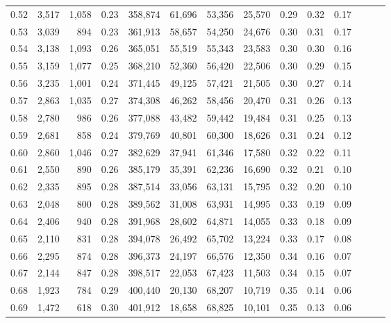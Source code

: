 \begin{tabular}{rrrrrrrrrrrrrr}
0.52 &   3,517 &  1,058 &  0.23 &  358,874 &   61,696 &  53,356 &  25,570 &  0.29 &  0.32 &      0.17 \\
0.53 &   3,039 &    894 &  0.23 &  361,913 &   58,657 &  54,250 &  24,676 &  0.30 &  0.31 &      0.17 \\
0.54 &   3,138 &  1,093 &  0.26 &  365,051 &   55,519 &  55,343 &  23,583 &  0.30 &  0.30 &      0.16 \\
0.55 &   3,159 &  1,077 &  0.25 &  368,210 &   52,360 &  56,420 &  22,506 &  0.30 &  0.29 &      0.15 \\
0.56 &   3,235 &  1,001 &  0.24 &  371,445 &   49,125 &  57,421 &  21,505 &  0.30 &  0.27 &      0.14 \\
0.57 &   2,863 &  1,035 &  0.27 &  374,308 &   46,262 &  58,456 &  20,470 &  0.31 &  0.26 &      0.13 \\
0.58 &   2,780 &    986 &  0.26 &  377,088 &   43,482 &  59,442 &  19,484 &  0.31 &  0.25 &      0.13 \\
0.59 &   2,681 &    858 &  0.24 &  379,769 &   40,801 &  60,300 &  18,626 &  0.31 &  0.24 &      0.12 \\
0.60 &   2,860 &  1,046 &  0.27 &  382,629 &   37,941 &  61,346 &  17,580 &  0.32 &  0.22 &      0.11 \\
0.61 &   2,550 &    890 &  0.26 &  385,179 &   35,391 &  62,236 &  16,690 &  0.32 &  0.21 &      0.10 \\
0.62 &   2,335 &    895 &  0.28 &  387,514 &   33,056 &  63,131 &  15,795 &  0.32 &  0.20 &      0.10 \\
0.63 &   2,048 &    800 &  0.28 &  389,562 &   31,008 &  63,931 &  14,995 &  0.33 &  0.19 &      0.09 \\
0.64 &   2,406 &    940 &  0.28 &  391,968 &   28,602 &  64,871 &  14,055 &  0.33 &  0.18 &      0.09 \\
0.65 &   2,110 &    831 &  0.28 &  394,078 &   26,492 &  65,702 &  13,224 &  0.33 &  0.17 &      0.08 \\
0.66 &   2,295 &    874 &  0.28 &  396,373 &   24,197 &  66,576 &  12,350 &  0.34 &  0.16 &      0.07 \\
0.67 &   2,144 &    847 &  0.28 &  398,517 &   22,053 &  67,423 &  11,503 &  0.34 &  0.15 &      0.07 \\
0.68 &   1,923 &    784 &  0.29 &  400,440 &   20,130 &  68,207 &  10,719 &  0.35 &  0.14 &      0.06 \\
0.69 &   1,472 &    618 &  0.30 &  401,912 &   18,658 &  68,825 &  10,101 &  0.35 &  0.13 &      0.06 \\

\end{tabular}
